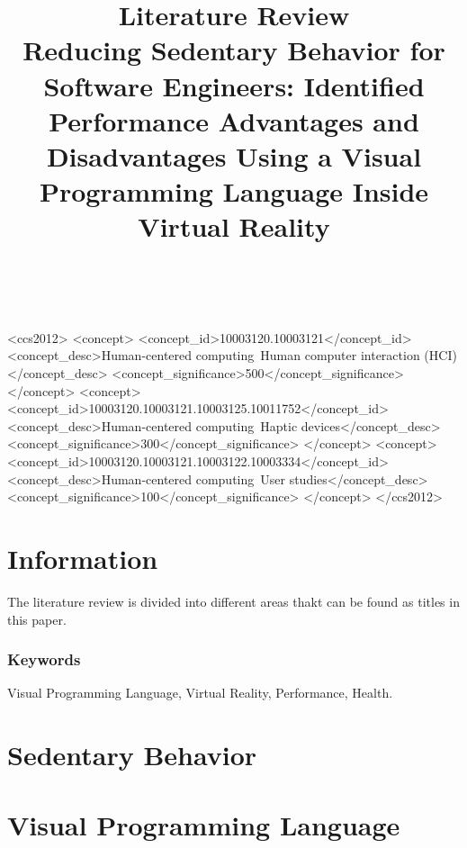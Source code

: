 \documentclass{sigchi}
\def\plaintitle{Literature Review}
\def\subplaintitle{
  Reducing Sedentary Behavior for Software Engineers: Identified Performance Advantages and Disadvantages Using a Visual Programming Language Inside Virtual Reality}
\begin{document}
\title{%
  \plaintitle \\
  \large \subplaintitle
}

\author{
  \\
}

\maketitle



\begin{CCSXML}
  <ccs2012>
  <concept>
  <concept_id>10003120.10003121</concept_id>
  <concept_desc>Human-centered computing~Human computer interaction (HCI)</concept_desc>
  <concept_significance>500</concept_significance>
  </concept>
  <concept>
  <concept_id>10003120.10003121.10003125.10011752</concept_id>
  <concept_desc>Human-centered computing~Haptic devices</concept_desc>
  <concept_significance>300</concept_significance>
  </concept>
  <concept>
  <concept_id>10003120.10003121.10003122.10003334</concept_id>
  <concept_desc>Human-centered computing~User studies</concept_desc>
  <concept_significance>100</concept_significance>
  </concept>
  </ccs2012>
\end{CCSXML}


\section{Information}
The literature review is divided into different areas thakt can be found as titles in this paper.

\subsubsection{Keywords}
Visual Programming Language, Virtual Reality, Performance, Health.

\section{Sedentary Behavior}

\section{Visual Programming Language}
\end{document}
